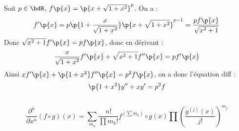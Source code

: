 \documentclass[a4paper,french,bookmarks]{book}
\begin{document}
    Soit $p \in \bdR$, $f\p{x} = \p{x + \sqrt{1 + x^2}}^p$. On a :
    \[f'\p{x} = p\p{1 + \dfrac{x}{\sqrt{1 + x^2}}}\p{x + \sqrt{1 + x^2}}^{p-1} = \dfrac{pf\p{x}}{\sqrt{x^2 + 1}}\]
    Donc $\sqrt{x^2 + 1}f'\p{x} = pf\p{x}$, donc en dérivant :
    \[ \dfrac{x}{\sqrt{1 + x^2}}f'\p{x} + \sqrt{x^2 + 1}f''\p{x} = pf'\p{x}\]
    Ainsi $xf'\p{x} + \p{1 + x^2}f''\p{x} = p^2f\p{x}$, on a donc l'équation diff :
    \[ \p{1 + x^2}y'' + xy' = p^2f\]
    
    
    \subsection{}

    \begin{equation}
        \dfrac{\partial^n}{\partial x^n}\left(f\circ g\right)(x) = \sum_{m_k} \dfrac{n!}{\prod m_k!} f^{(\sum m_k)}\circ g(x) \prod \left(\dfrac{g^{(j)}(x)}{j!}\right)^{m_j}
    \end{equation}
    
\end{document}

